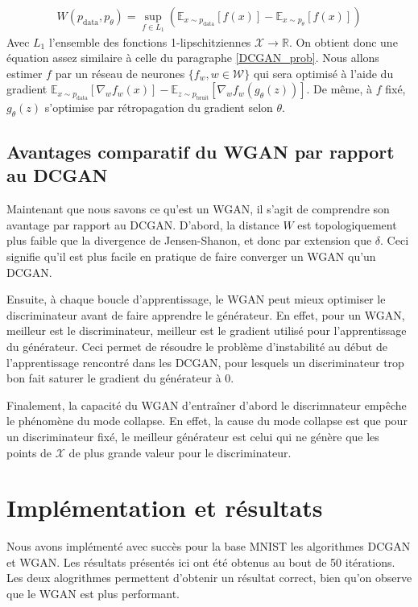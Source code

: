 $$\begin{aligned}
W(p_{\mathrm{data}}, p_{\theta}) = \sup_{f \in L_{1}}\left(\mathbb{E}_{x\sim p_{\mathrm{data}}} [f(x)] - \mathbb{E}_{x\sim p_{\theta}} [f(x)]\right)
\end{aligned}$$
 Avec $L_{1}$ l'ensemble des fonctions 1-lipschitziennes $\mathcal{X} \longrightarrow \mathbb{R}$. On obtient donc une équation assez similaire à celle du paragraphe \ref{DCGAN_prob}. Nous allons estimer $f$ par un réseau de neurones $\{f_{w}, w \in \mathcal{W} \}$ qui sera optimisé à l'aide du gradient $\mathbb{E}_{x\sim p_{\mathrm{data}}} \left[\nabla_{w}f_{w}(x)\right] - \mathbb{E}_{z\sim p_{\mathrm{bruit}}} \left[\nabla_{w}f_{w}(g_{\theta}(z))\right]$. De même, à $f$ fixé, $g_{\theta}(z)$ s'optimise par rétropagation du gradient selon $\theta$.
 
 \subsection{Avantages comparatif du WGAN par rapport au DCGAN}
 
Maintenant que nous savons ce qu'est un WGAN, il s'agit de comprendre son avantage par rapport au DCGAN. D'abord, la distance $W$ est topologiquement plus faible que la divergence de Jensen-Shanon, et donc par extension que $\delta$. Ceci signifie qu'il est plus facile en pratique de faire converger un WGAN qu'un DCGAN.

Ensuite, à chaque boucle d'apprentissage, le WGAN peut mieux optimiser le discriminateur avant de faire apprendre le générateur. En effet, pour un WGAN, meilleur est le discriminateur, meilleur est le gradient utilisé pour l'apprentissage du générateur. Ceci permet de résoudre le problème d'instabilité au début de l'apprentissage rencontré dans les DCGAN, pour lesquels un discriminateur trop bon fait saturer le gradient du générateur à 0.

Finalement, la capacité du WGAN d'entraîner d'abord le discrimnateur empêche le phénomène du mode collapse. En effet, la cause du mode collapse est que pour un discriminateur fixé, le meilleur générateur est celui qui ne génère que les points de $\mathcal{X}$ de plus grande valeur pour le discriminateur.

\section{Implémentation et résultats}

Nous avons implémenté avec succès pour la base MNIST les algorithmes DCGAN et WGAN. Les résultats présentés ici ont été obtenus au bout de 50 itérations. Les deux alogrithmes permettent d'obtenir un résultat correct, bien qu'on observe que le WGAN est plus performant.

